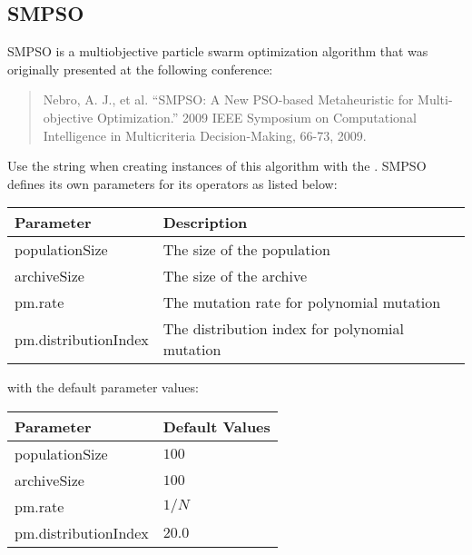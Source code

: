 \subsection{SMPSO}
SMPSO is a multiobjective particle swarm optimization algorithm that was originally presented at the following conference:
\begin{quote}
Nebro, A. J., et al.  ``SMPSO: A New PSO-based Metaheuristic for Multi-objective Optimization.''  2009 IEEE Symposium on Computational Intelligence in Multicriteria Decision-Making, 66-73, 2009.
\end{quote}
Use the string  when creating instances of this algorithm with the .  SMPSO defines its own parameters for its operators as listed below:
\newline
\newline
\begin{tabularx}{\linewidth}{lX}
  \hline
  Parameter & Description \\
  \hline
  populationSize & The size of the population \\
  archiveSize & The size of the archive \\
  pm.rate & The mutation rate for polynomial mutation \\
  pm.distributionIndex & The distribution index for polynomial mutation \\
  \hline
\end{tabularx}
\newline
\newline
with the default parameter values:
\newline
\newline
\begin{tabularx}{\linewidth}{lX}
  \hline
  Parameter & Default Values \\
  \hline
  populationSize & $100$ \\
  archiveSize & $100$ \\
  pm.rate & $1/N$ \\
  pm.distributionIndex & $20.0$ \\
  \hline
\end{tabularx}

